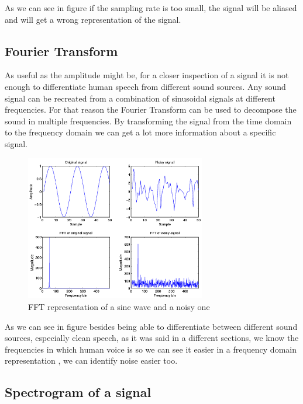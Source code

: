 As we can see in figure  if the sampling rate is too small, the signal will be aliased and will get a wrong representation of the signal.

\subsection{Fourier Transform}
As useful as the amplitude might be, for a closer inspection of a signal it is not enough to differentiate human speech from different sound sources. Any sound signal can be recreated from a combination of sinusoidal signals at different frequencies.  For that reason the Fourier Transform can be used to decompose the sound in multiple frequencies. By transforming the signal from the time domain to the frequency domain we can get a lot more information about a specific signal.

\begin{figure}[htp]
	\centering
	\includegraphics[width=0.7\textwidth]{Illustrations/fftSignals.png}
	\caption{FFT representation of a sine wave and a noisy one}
	\label{fig:fftSignal}
\end{figure}

As we can see in figure  besides being able to differentiate between different sound sources, especially clean speech, as it was said in a different sections, we know the frequencies in which human voice is so we can see it easier in a frequency domain representation , we can identify noise easier too.

\subsection{Spectrogram of a signal}

